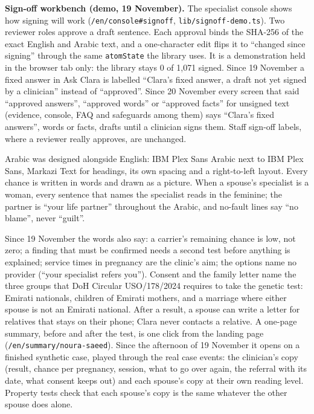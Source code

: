 \documentclass[10.5pt,a4paper]{article}
\newcommand{\code}[1]{\texttt{\small #1}}
\newcommand{\file}[1]{\leavevmode\textcolor{muted}{\texttt{\small #1}}}
\begin{document}
\textbf{Sign-off workbench (demo, 19 November).} The specialist console shows how signing will work
(\code{/en/console\#signoff}, \file{lib/signoff-demo.ts}). Two reviewer roles approve a draft sentence. Each approval
binds the SHA-256 of the exact English and Arabic text, and a one-character edit flips it to ``changed since signing''
through the same \code{atomState} the library uses. It is a demonstration held in the browser tab only: the library
stays 0 of 1,071 signed. Since 19 November a fixed answer in Ask Clara is labelled ``Clara's fixed answer, a draft not
yet signed by a clinician'' instead of ``approved''. Since 20 November every screen that said ``approved answers'',
``approved words'' or ``approved facts'' for unsigned text (evidence, console, FAQ and safeguards among them) says
``Clara's fixed answers'', words or facts, drafts until a clinician signs them. Staff sign-off labels, where a reviewer
really approves, are unchanged.

Arabic was designed alongside English: IBM Plex Sans Arabic next to IBM Plex Sans, Markazi Text for headings, its own
spacing and a right-to-left layout. Every chance is written in words and drawn as a picture. When a spouse's
specialist is a woman, every sentence that names the specialist reads in the feminine; the partner is ``your life
partner'' throughout the Arabic, and no-fault lines say ``no blame'', never ``guilt''.

Since 19 November the words also say: a carrier's remaining chance is low, not zero; a finding that must be confirmed
needs a second test before anything is explained; service times in pregnancy are the clinic's aim; the options name no
provider (``your specialist refers you''). Consent and the family letter name the three groups that DoH Circular
USO/178/2024 requires to take the genetic test: Emirati nationals, children of Emirati mothers, and a marriage where
either spouse is not an Emirati national. After a result, a spouse can write a letter for relatives that stays on their
phone; Clara never contacts a relative. A one-page summary, before and after the test, is one click from the landing
page (\code{/en/summary/noura-saeed}). Since the afternoon of 19 November it opens on a finished synthetic case, played
through the real case events: the clinician's copy (result, chance per pregnancy, session, what to go over again, the
referral with its date, what consent keeps out) and each spouse's copy at their own reading level. Property tests check
that each spouse's copy is the same whatever the other spouse does alone.
\end{document}
